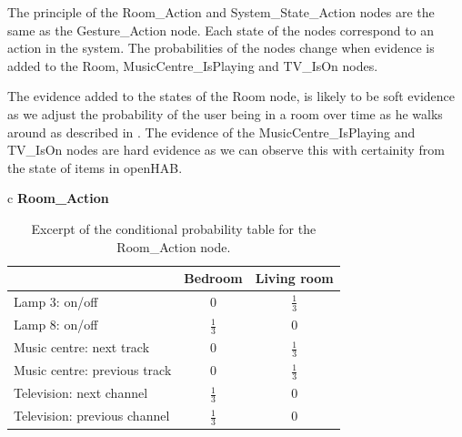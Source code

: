The principle of the Room\_Action and System\_State\_Action nodes are the same as the Gesture\_Action node. Each state of the nodes correspond to an action in the system. The probabilities of the nodes change when evidence is added to the Room, MusicCentre\_IsPlaying and TV\_IsOn nodes.

The evidence added to the states of the Room node, is likely to be soft evidence as we adjust the probability of the user being in a room over time as he walks around as described in . The evidence of the MusicCentre\_IsPlaying and TV\_IsOn nodes are hard evidence as we can observe this with certainity from the state of items in openHAB.

\begin{table}[h!]
\centering
\caption{Excerpt of the conditional probability table for the Room\_Action node.}
\label{tbl:design:bayesian-network:cpt-room-action}
\begin{tabular}{c}
\textbf{Room\_Action}   \\
\begin{tabular}{l|cc}
                             & Bedroom & Living room \\ \hline
Lamp 3: on/off               & 0 & $\frac{1}{3}$ \\
Lamp 8: on/off               & $\frac{1}{3}$ & 0 \\
Music centre: next track     & 0   & $\frac{1}{3}$ \\
Music centre: previous track & 0    & $\frac{1}{3}$ \\
Television: next channel     & $\frac{1}{3}$   & 0  \\
Television: previous channel & $\frac{1}{3}$   & 0  \\
\end{tabular}
\end{tabular}
\end{table}

